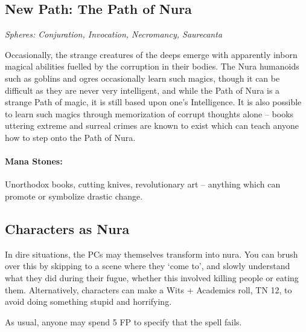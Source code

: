 \begin{multicols}{2}

\subsection{New Path: The Path of Nura}

\textit{Spheres: Conjuration, Invocation, Necromancy, Saurecanta}

\noindent Occasionally, the strange creatures of the deeps emerge with apparently inborn magical abilities fuelled by the corruption in their bodies.
The Nura humanoids such as goblins and ogres occasionally learn such magics, though it can be difficult as they are never very intelligent, and while the Path of Nura is a strange Path of magic, it is still based upon one's Intelligence.
It is also possible to learn such magics through memorization of corrupt thoughts alone -- books uttering extreme and surreal crimes are known to exist which can teach anyone how to step onto the Path of Nura.

\paragraph{Mana Stones:} Unorthodox books, cutting knives, revolutionary art -- anything which can promote or symbolize drastic change.

\subsection{Characters as Nura}

In dire situations, the PCs may themselves transform into nura.
You can brush over this by skipping to a scene where they `come to', and slowly understand what they did during their fugue, whether this involved killing people or eating them.
Alternatively, characters can make a Wits + Academics roll, TN 12, to avoid doing something stupid and horrifying.

As usual, anyone may spend 5 FP to specify that the spell fails.

\end{multicols}



